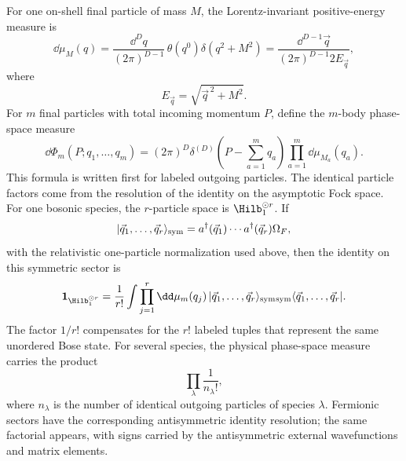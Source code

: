 \begin{definition}
\label{def:invariant-final-state-phase-space}
For one on-shell final particle of mass \(M\), the Lorentz-invariant
positive-energy measure is
\[
  \dd\mu_M(q)
  =
  \frac{\dd^Dq}{(2\pi)^{D-1}}\,
  \theta(q^0)\delta(q^2+M^2)
  =
  \frac{\dd^{D-1}\vec q}{(2\pi)^{D-1}2E_{\vec q}},
\]
where
\[
  E_{\vec q}=\sqrt{\vec q^{\,2}+M^2}.
\]
For \(m\) final particles with total incoming momentum \(P\), define the
\(m\)-body phase-space measure
\[
  \dd\Phi_m(P;q_1,\ldots,q_m)
  =
  (2\pi)^D\delta^{(D)}\!\left(P-\sum_{a=1}^m q_a\right)
  \prod_{a=1}^m\dd\mu_{M_a}(q_a).
\]
This formula is written first for labeled outgoing particles.  The identical
particle factors come from the resolution of the identity on the asymptotic
Fock space.  For one bosonic species, the \(r\)-particle space is
\(\Hilb_1^{\odot r}\).  If
\[
  |\vec q_1,\ldots,\vec q_r\rangle_{\rm sym}
  =
  a^\dagger(\vec q_1)\cdots a^\dagger(\vec q_r)\Omega_F ,
\]
with the relativistic one-particle normalization used above, then the identity
on this symmetric sector is
\[
  \mathbf 1_{\Hilb_1^{\odot r}}
  =
  \frac1{r!}
  \int
  \prod_{j=1}^r\dd\mu_m(q_j)\,
  |\vec q_1,\ldots,\vec q_r\rangle_{\rm sym}
  {}_{\rm sym}\langle \vec q_1,\ldots,\vec q_r| .
\]
The factor \(1/r!\) compensates for the \(r!\) labeled tuples that represent
the same unordered Bose state.  For several species, the physical phase-space
measure carries the product
\[
  \prod_\lambda\frac1{n_\lambda!},
\]
where \(n_\lambda\) is the number of identical outgoing particles of species
\(\lambda\).  Fermionic sectors have the corresponding antisymmetric identity
resolution; the same factorial appears, with signs carried by the
antisymmetric external wavefunctions and matrix elements.
\end{definition}

